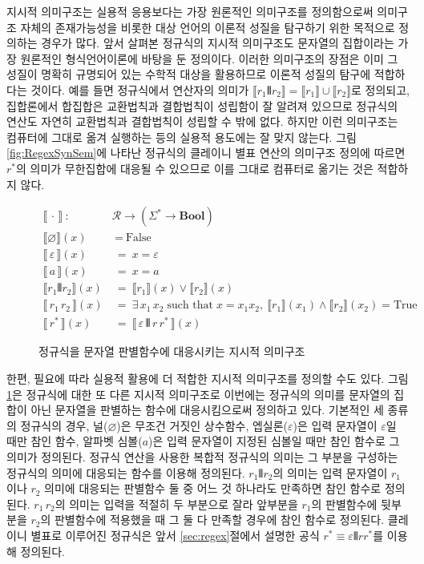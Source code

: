 지시적 의미구조는 실용적 응용보다는 가장 원론적인 의미구조를 정의함으로써
의미구조 자체의 존재가능성을 비롯한 대상 언어의 이론적 성질을 탐구하기 위한
목적으로 정의하는 경우가 많다. 앞서 살펴본 정규식의 지시적 의미구조도
문자열의 집합이라는 가장 원론적인 형식언어이론에 바탕을 둔 정의이다.
이러한 의미구조의 장점은 이미 그 성질이 명확히 규명되어 있는 수학적 대상을
활용하므로 이론적 성질의 탐구에 적합하다는 것이다. 예를 들면
정규식에서 \VERT 연산자의 의미가 $ \llbracket r_1\VERT r_2\rrbracket
= \llbracket r_1\rrbracket\cup\llbracket r_2\rrbracket$로 정의되고,
집합론에서 합집합은 교환법칙과 결합법칙이 성립함이 잘 알려져 있으므로
정규식의 \VERT 연산도 자연히 교환법칙과 결합법칙이 성립할 수 밖에 없다.
하지만 이런 의미구조는 컴퓨터에 그대로 옮겨 실행하는 등의 실용적 용도에는
잘 맞지 않는다. 그림\;\ref{fig:RegexSynSem}에 나타난 정규식의
클레이니 별표 연산의 의미구조 정의에 따르면 $r^{*}$의 의미가 무한집합에
대응될 수 있으므로 이를 그대로 컴퓨터로 옮기는 것은 적합하지 않다.

\begin{figure}
\begin{align*}
\llbracket\,\cdot\,\rrbracket
 ~:~& \mathcal{R} \to (\Sigma^{*} \to \textbf{Bool})
\\
\llbracket \varnothing \rrbracket(x)   &~=~ \text{False} \\
\llbracket\,\varepsilon\,\rrbracket(x) &~=~ x=\varepsilon \\
\llbracket\,a\,\rrbracket(x)           &~=~ x=a \\
\llbracket r_1 \VERT r_2 \rrbracket(x) &~=~
 \llbracket r_1\rrbracket(x) \lor \llbracket r_2\rrbracket(x)\\
\llbracket\,r_1 \, r_2\,\rrbracket(x) &~=~
  \exists\,x_1\,x_2 \;\text{such that}\; x=x_1x_2,~
  \llbracket r_1\rrbracket(x_1) \land \llbracket r_2\rrbracket(x_2)
  = \text{True} \\
\llbracket\, r^{*} \,\rrbracket(x) &~=~
 \llbracket\,\varepsilon\,\VERT\,r\,r^{*}\,\rrbracket(x)
\end{align*}
\caption{정규식을 문자열 판별함수에 대응시키는
         지시적 의미구조\label{fig:RegexDenoSem}}
\end{figure}

한편, 필요에 따라 실용적 활용에 더 적합한 지시적 의미구조를
정의할 수도 있다. 그림\;\ref{fig:RegexDenoSem}은 정규식에 대한
또 다른 지시적 의미구조로 이번에는 정규식의 의미를 문자열의 집합이
아닌 문자열을 판별하는 함수에 대응시킴으로써 정의하고 있다. 기본적인
세 종류의 정규식의 경우, 널($\varnothing$)은 무조건 거짓인 상수함수,
엡실론($\varepsilon$)은 입력 문자열이 $\varepsilon$일 때만 참인 함수,
알파벳 심볼($a$)은 입력 문자열이 지정된 심볼일 때만 참인 함수로 그
의미가 정의된다. 정규식 연산을 사용한 복합적 정규식의 의미는
그 부분을 구성하는 정규식의 의미에 대응되는 함수를 이용해 정의된다.
$r_1\VERT r_2$의 의미는 입력 문자열이 $r_1$이나 $r_2$ 의미에 대응되는
판별함수 둘 중 어느 것 하나라도 만족하면 참인 함수로 정의된다.
$r_1\,r_2$의 의미는 입력을 적절히 두 부분으로 잘라 앞부분을 $r_1$의
판별함수에 뒷부분을 $r_2$의 판별함수에 적용했을 때 그 둘 다
만족할 경우에 참인 함수로 정의된다. 클레이니 별표로
이루어진 정규식은 앞서 \ref{sec:regex}절에서 설명한 공식
$r^{*} \equiv \varepsilon\VERT rr^{*}$를 이용해 정의된다.

